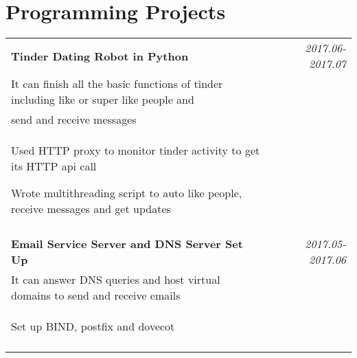 \documentclass[a4paper,10pt]{article}
\begin{document}
\section{Programming Projects}
\begin{tabular}{p{13.5cm}p{0.5cm}r}

\textbf{Tinder Dating Robot in Python} && \emph{2017.06-2017.07} \\
\hspace{1em} It can finish all the basic functions of tinder including like or super like people and && \vspace{-0.5em}\\
\hspace{1em} send and receive messages && \vspace{-0.5em} \\
\begin{compactitem}
  \item Used HTTP proxy to monitor tinder activity to get its HTTP api call\vspace{0.2em}
  \item Wrote multithreading script to auto like people, receive messages and get updates\vspace{0.2em}
\end{compactitem}&&\vspace{-2.2em} \\
\multicolumn{3}{c}{} \\


\textbf{Email Service Server and DNS Server Set Up} && \emph{2017.05-2017.06} \\
\hspace{1em} It can answer DNS queries and host virtual domains to send and receive emails && \vspace{-0.5em} \\
\begin{compactitem}
  \item Set up BIND, postfix and dovecot \vspace{0.2em}  
\end{compactitem}&&\vspace{-2.2em} \\
\multicolumn{3}{c}{} \\



\end{tabular}
\end{document}
